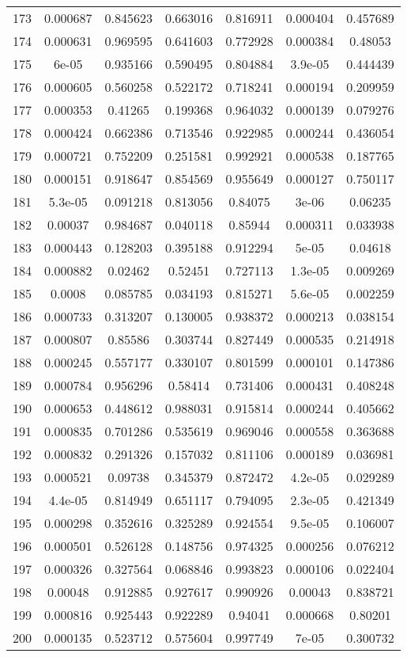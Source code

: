 \begin{table}
\begin{tabular}{c|c|c|c|c|c|c}
173 & 0.000687 & 0.845623 & 0.663016 & 0.816911 & 0.000404 & 0.457689\\
174 & 0.000631 & 0.969595 & 0.641603 & 0.772928 & 0.000384 & 0.48053\\
175 & 6e-05 & 0.935166 & 0.590495 & 0.804884 & 3.9e-05 & 0.444439\\
176 & 0.000605 & 0.560258 & 0.522172 & 0.718241 & 0.000194 & 0.209959\\
177 & 0.000353 & 0.41265 & 0.199368 & 0.964032 & 0.000139 & 0.079276\\
178 & 0.000424 & 0.662386 & 0.713546 & 0.922985 & 0.000244 & 0.436054\\
179 & 0.000721 & 0.752209 & 0.251581 & 0.992921 & 0.000538 & 0.187765\\
180 & 0.000151 & 0.918647 & 0.854569 & 0.955649 & 0.000127 & 0.750117\\
181 & 5.3e-05 & 0.091218 & 0.813056 & 0.84075 & 3e-06 & 0.06235\\
182 & 0.00037 & 0.984687 & 0.040118 & 0.85944 & 0.000311 & 0.033938\\
183 & 0.000443 & 0.128203 & 0.395188 & 0.912294 & 5e-05 & 0.04618\\
184 & 0.000882 & 0.02462 & 0.52451 & 0.727113 & 1.3e-05 & 0.009269\\
185 & 0.0008 & 0.085785 & 0.034193 & 0.815271 & 5.6e-05 & 0.002259\\
186 & 0.000733 & 0.313207 & 0.130005 & 0.938372 & 0.000213 & 0.038154\\
187 & 0.000807 & 0.85586 & 0.303744 & 0.827449 & 0.000535 & 0.214918\\
188 & 0.000245 & 0.557177 & 0.330107 & 0.801599 & 0.000101 & 0.147386\\
189 & 0.000784 & 0.956296 & 0.58414 & 0.731406 & 0.000431 & 0.408248\\
190 & 0.000653 & 0.448612 & 0.988031 & 0.915814 & 0.000244 & 0.405662\\
191 & 0.000835 & 0.701286 & 0.535619 & 0.969046 & 0.000558 & 0.363688\\
192 & 0.000832 & 0.291326 & 0.157032 & 0.811106 & 0.000189 & 0.036981\\
193 & 0.000521 & 0.09738 & 0.345379 & 0.872472 & 4.2e-05 & 0.029289\\
194 & 4.4e-05 & 0.814949 & 0.651117 & 0.794095 & 2.3e-05 & 0.421349\\
195 & 0.000298 & 0.352616 & 0.325289 & 0.924554 & 9.5e-05 & 0.106007\\
196 & 0.000501 & 0.526128 & 0.148756 & 0.974325 & 0.000256 & 0.076212\\
197 & 0.000326 & 0.327564 & 0.068846 & 0.993823 & 0.000106 & 0.022404\\
198 & 0.00048 & 0.912885 & 0.927617 & 0.990926 & 0.00043 & 0.838721\\
199 & 0.000816 & 0.925443 & 0.922289 & 0.94041 & 0.000668 & 0.80201\\
200 & 0.000135 & 0.523712 & 0.575604 & 0.997749 & 7e-05 & 0.300732\\
\end{tabular}
\end{table}
